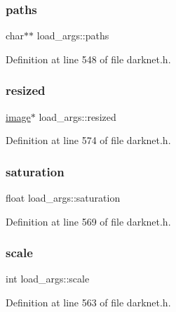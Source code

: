 \subsubsection{\texorpdfstring{paths}{paths}}
{\footnotesize\ttfamily char$\ast$$\ast$ load\+\_\+args\+::paths}



Definition at line 548 of file darknet.\+h.

\mbox{\label{structload__args_aa9dc3e3e93a6031df60420a5cb36c508}} 
\subsubsection{\texorpdfstring{resized}{resized}}
{\footnotesize\ttfamily \mbox{\hyperlink{structimage}{image}}$\ast$ load\+\_\+args\+::resized}



Definition at line 574 of file darknet.\+h.

\mbox{\label{structload__args_ad478a463de03972022a6c6f89c7c4912}} 
\subsubsection{\texorpdfstring{saturation}{saturation}}
{\footnotesize\ttfamily float load\+\_\+args\+::saturation}



Definition at line 569 of file darknet.\+h.

\mbox{\label{structload__args_a27932099db4ddca9b7ca717f92891a44}} 
\subsubsection{\texorpdfstring{scale}{scale}}
{\footnotesize\ttfamily int load\+\_\+args\+::scale}



Definition at line 563 of file darknet.\+h.

\mbox{\label{structload__args_a57fbd5eb4f1b223ad19b5324fa01b184}} 
